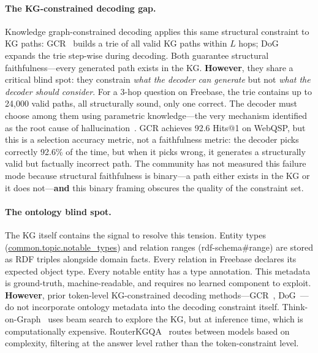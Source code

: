 \documentclass[11pt,twoside]{article}
\begin{document}
\paragraph{The KG-constrained decoding gap.} Knowledge graph-constrained decoding applies this same structural constraint to KG paths: GCR~\citep{luo2025-graph-constrained-reasoning} builds a trie of all valid KG paths within $L$ hops; DoG~\citep{li2024-decoding-on-graphs} expands the trie step-wise during decoding. Both guarantee structural faithfulness---every generated path exists in the KG. \textbf{However}, they share a critical blind spot: they constrain \emph{what the decoder can generate} but not \emph{what the decoder should consider}. For a 3-hop question on Freebase, the trie contains up to 24,000 valid paths, all structurally sound, only one correct. The decoder must choose among them using parametric knowledge---the very mechanism identified as the root cause of hallucination~\citep{huang2023hallucination}. GCR achieves 92.6 Hits@1 on WebQSP, but this is a selection accuracy metric, not a faithfulness metric: the decoder picks correctly 92.6\% of the time, but when it picks wrong, it generates a structurally valid but factually incorrect path. The community has not measured this failure mode because structural faithfulness is binary---a path either exists in the KG or it does not---\textbf{and} this binary framing obscures the quality of the constraint set.

\paragraph{The ontology blind spot.} The KG itself contains the signal to resolve this tension. Entity types (\url{common.topic.notable_types}) and relation ranges (rdf-schema\#range) are stored as RDF triples alongside domain facts. Every relation in Freebase declares its expected object type. Every notable entity has a type annotation. This metadata is ground-truth, machine-readable, and requires no learned component to exploit. \textbf{However}, prior token-level KG-constrained decoding methods---GCR~\citep{luo2025-graph-constrained-reasoning}, DoG~\citep{li2024-decoding-on-graphs}---do not incorporate ontology metadata into the decoding constraint itself. Think-on-Graph~\citep{sun2024tog} uses beam search to explore the KG, but at inference time, which is computationally expensive. RouterKGQA~\citep{yuan2026routerkgqa} routes between models based on complexity, filtering at the answer level rather than the token-constraint level.
\end{document}
